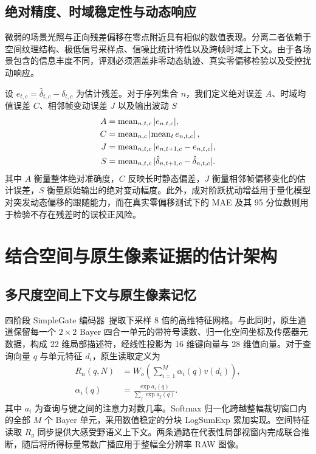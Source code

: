 \subsection{绝对精度、时域稳定性与动态响应}
微弱的场景光照与正向残差偏移在零点附近具有相似的数值表现。分离二者依赖于空间纹理结构、极低信号采样点、信噪比统计特性以及跨帧时域上下文。由于各场景包含的信息丰度不同，评测必须涵盖非零动态轨迹、真实零偏移检验以及受控扰动响应。

设 $e_{t,c}=\hat\delta_{t,c}-\delta_{t,c}$ 为估计残差。对于序列集合 $n$，我们定义绝对误差 $A$、时域均值误差 $C$、相邻帧变动误差 $J$ 以及输出波动 $S$
\begin{align}
 A&=\operatorname{mean}_{n,t,c}|e_{n,t,c}|,\label{eq:A}\\
 C&=\operatorname{mean}_{n,c}\left|\operatorname{mean}_t e_{n,t,c}\right|,\label{eq:C}\\
 J&=\operatorname{mean}_{n,t,c}|e_{n,t+1,c}-e_{n,t,c}|,\label{eq:J}\\
 S&=\operatorname{mean}_{n,t,c}|\hat\delta_{n,t+1,c}-\hat\delta_{n,t,c}|.\label{eq:S}
\end{align}
其中 $A$ 衡量整体绝对准确度，$C$ 反映长时静态偏差，$J$ 衡量相邻帧偏移变化的估计误差，$S$ 衡量原始输出的绝对变动幅度。此外，成对阶跃扰动增益用于量化模型对突发动态偏移的跟随能力，而在真实零偏移测试下的 MAE 及其 95 分位数则用于检验不存在残差时的误校正风险。


\section{结合空间与原生像素证据的估计架构}
\label{sec:method}

\subsection{多尺度空间上下文与原生像素记忆}
四阶段 SimpleGate 编码器~\cite{naf}提取下采样 8 倍的高维特征网格。与此同时，原生通道保留每一个 $2\times2$ Bayer 四合一单元的带符号读数、归一化空间坐标及传感器元数据，构成 22 维局部描述符，经线性投影为 16 维键向量与 28 维值向量。对于查询向量 $q$ 与单元特征 $d_i$，原生读取定义为
\begin{equation}
\begin{aligned}
 R_n(q,N)&=W_o\!\left(\sum_{i=1}^{M}\alpha_i(q)v(d_i)\right),\\
 \alpha_i(q)&=\frac{\exp a_i(q)}{\sum_j\exp a_j(q)}.
\end{aligned}\label{eq:read}
\end{equation}
其中 $a_i$ 为查询与键之间的注意力对数几率。Softmax 归一化跨越整幅裁切窗口内的全部 $M$ 个 Bayer 单元，采用数值稳定的分块 LogSumExp 累加实现。空间特征读取 $R_g$ 同步提供大感受野语义上下文。两条通路在代表性局部视窗内完成联合推断，随后将所得标量常数广播应用于整幅全分辨率 RAW 图像。

